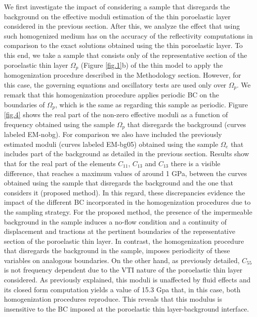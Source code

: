 \documentclass[draft]{agujournal2019}
\begin{document}
We first investigate the impact of considering a sample that disregards the background on the effective moduli estimation of the thin poroelastic layer considered in the previous section. After this, we analyze the effect that using such homogenized medium has on the accuracy of the reflectivity computations in comparison to the exact solutions obtained using the thin poroelastic layer. To this end, we take a sample that consists only of the representative section of the poroelastic thin layer $\Omega_p$ (Figure \ref{fig.1}b) of the thin model to apply the homogenization procedure described in the Methodology section. However, for this case, the governing equations and oscillatory tests are used only over $\Omega_p$. We remark that this homogenization procedure applies periodic BC on the boundaries of $\Omega_p$, which is the same as regarding this sample as periodic.
Figure \ref{fig.4} shows the real part of the non-zero effective moduli as a function of frequency obtained using the sample $\Omega_p$ that disregards the background (curves labeled EM-nobg). For comparison we also have included the previously estimated moduli (curves labeled EM-bg05) obtained using the sample $\Omega_e$  that includes part of the background as detailed in the previous section. Results show that for the real part of the elements $C_{11}$, $C_{13}$ and $C_{13}$ there is a visible difference, that reaches a maximum values of around 1 GPa, between the curves obtained using the sample that disregards the background and the one that considers it (proposed method). In this regard, these discrepancies evidence the impact of the different BC incorporated in the homogenization procedures due to the sampling strategy. For the proposed method, the presence of the impermeable background in the sample induces a no-flow condition and a continuity  of displacement and tractions at the pertinent boundaries of the representative section of the poroelastic thin layer. In contrast, the homogenization procedure that disregards the background in the sample, imposes periodicity of these variables on analogous boundaries. On the other hand, as previously detailed,  $C_{55}$ is not frequency dependent due to the VTI nature of the poroelastic thin layer considered. As previously explained, this moduli is unaffected by fluid effects and its closed form computation yields a value of 15.3 Gpa that, in this case, both homogenization procedures reproduce. This reveals that this modulus is insensitive to the BC imposed at the poroelastic thin layer-background interface.
\end{document}
